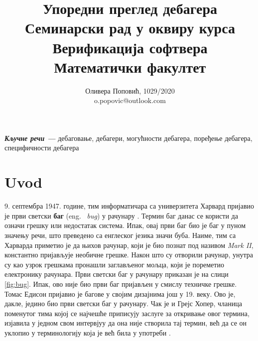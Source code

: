 \documentclass[a4paper]{article}
\providecommand{\keywords}[1]
{
  \small	
  \textbf{\textit{Кључне речи ---}} #1
}
\begin{document}
\title{Упоредни преглед дебагера\\ \small{Семинарски рад у оквиру курса\\Верификација софтвера\\ Математички факултет}}

\author{Оливера Поповић, 1029/2020\\ o.popovic@outlook.com}
\maketitle


\keywords{дебаговање, дебагери, могућности дебагера, поређење дебагера, специфичности дебагера}

\tableofcontents

\newpage
\setlength{\parskip}{1em}

\section{Uvod}
\label{sec:uvod}

9. септембра 1947. године, тим информатичара са универзитета Харвард
пријавио је први светски \textbf{баг} (eng. ~{\em bug}) у рачунару \cite{firstBug}.
Термин баг данас се користи да означи грешку или недостатак система. 
Ипак, овај први баг био је баг у пуном значењу речи, што преведено са
енглеског језика значи буба. Наиме, тим са Харварда приметио је да 
њихов рачунар, који је био познат под називом {\em Mark II}, константно 
пријављује необичне грешке. Након што су
отворили рачунар, унутра су као узрок грешкама пронашли заглављеног 
мољца, који је пореметио електронику рачунара. Први светски баг у 
рачунару приказан је на слици \ref{fig:bug}. Ипак, ово није био
први баг пријављен у смислу техничке грешке. Томас Едисон пријавио је
багове у својим дизајнима још у 19. веку. Ово је, дакле, једино био 
први светски баг у рачунару. Чак је и Грејс Хопер, чланица поменутог
тима којој се најчешће приписују заслуге за откривање овог термина,
изјавила у једном свом интервјуу да она није створила тај термин, већ
да се он уклопио у терминологију која је већ била у употреби \cite{firstBug}.
\end{document}
